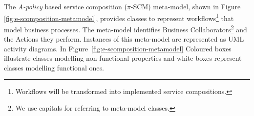 

The {\em A-policy} based service composition ($\pi$-SCM) meta-model, shown in Figure \ref{fig:e-scomposition-metamodel},
provides classes to represent workflows\footnote{Workflows will be transformed into implemented service compositions.} that model  business processes.
The meta-model identifies {\sc Business Collaborators}\footnote{We use {\sc capitals} for referring to meta-model classes.} and the {\sc Actions} they perform. 
Instances of this meta-model are represented as UML activity diagrams. 
In Figure~\ref{fig:e-scomposition-metamodel} 
 Coloured boxes illustrate classes  modelling  non-functional properties and 
 white boxes represent classes modelling functional ones. 

